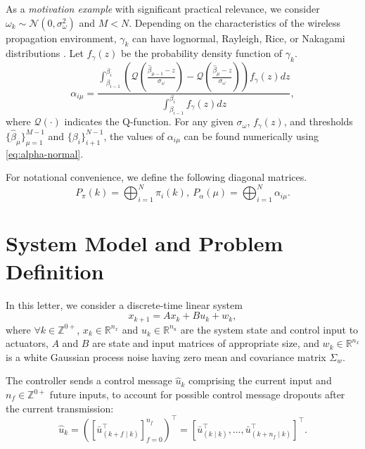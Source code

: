 \documentclass[journal,twoside,web]{ieeecolor}
\begin{document}
As a \emph{motivation example} with significant practical relevance, we consider $\omega_k \sim \mathcal{N}(0,\sigma_{\omega}^2)$ and $M<N$. 
Depending on the characteristics of the wireless propagation environment, $\gamma_k$ can have lognormal, Rayleigh, Rice, or Nakagami distributions \cite{stuber2017principles}. 
Let $f_{\gamma}(z)$ be the probability density function of $\gamma_k$.
\begin{equation}\label{eq:alpha-normal}
    \alpha_{i\mu} = \frac{
    \int_{\beta_{i-1}}^{\beta_{i}}\left(
    \mathcal{Q}\left(\frac{\hat{\beta}_{\mu-1}-z}{\sigma_{\omega}}\right) - 
    \mathcal{Q}\left(\frac{\hat{\beta}_{\mu}-z}{\sigma_{\omega}}\right) 
    \right) f_{\gamma}(z)dz}{
    \int_{\beta_{i-1}}^{\beta_{i}} f_{\gamma}(z)dz},
\end{equation}
where $\mathcal{Q}(\cdot)$ indicates the Q-function. For any given $\sigma_{\omega}$, $f_{\gamma}(z)$, and %
thresholds $\{\hat{\beta}_{\mu}\}_{\mu=1}^{M-1}$ and $\{\beta_{i}\}_{i+1}^{N-1}$, the values of $\alpha_{i\mu}$ can be found numerically using \eqref{eq:alpha-normal}.

For notational convenience, we define the following diagonal matrices.
\begin{equation}\label{eq:diag-prob}
     P_{\pi}^{}(k) = \bigoplus_{i=1}^{N} \pi_{i}(k),~P_{\alpha}^{}(\mu) = \bigoplus_{i=1}^{N} \alpha_{i\mu}.
\end{equation}

\section{System Model and Problem Definition}\label{sec:model}
In this letter, we consider a discrete-time linear system %
\begin{equation}\label{eq:state}
        x_{k+1} = A x_{k} + B u_{k}^{} + w_{k},
\end{equation}
where $\forall k \!\in\! \mathbb{Z}^{0+}$, $x_k\!\in\!\mathbb{R}^{n_x}$ and $u_k^{}\!\in\!\mathbb{R}^{n_u}$ are the system state and control input to actuators, $A$ and $B$ are state and input matrices of appropriate size, and $w_k\!\in\!\mathbb{R}^{n_x}$ is a white Gaussian process noise having zero mean and covariance matrix $\Sigma_w$.

The controller sends a control message $\hat{u}_k$ comprising the current input and $n_{f}\in\mathbb{Z}^{0+}$ future inputs, to account for possible control message dropouts after the current transmission: 
\begin{equation}\label{eq:control-message}
    \hat{u}_k =
    \left(\left[\bar{u}_{(k+f\mid k)}^{\top}\right]_{f=0}^{n_f}\right)^{\top} = 
    \left[\bar{u}_{(k\mid k)}^{\top},\dots,\bar{u}_{(k+n_f\mid k)}^{\top}\right]^{\top}.
\end{equation}
\end{document}
